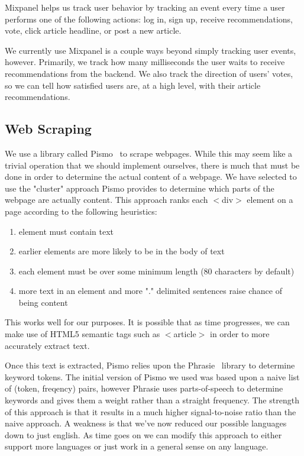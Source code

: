 \documentclass[11pt,letterpaper]{article}
\begin{document}
Mixpanel helps us track user behavior by tracking an event every time a user performs one of the following actions: log in, sign up, receive recommendations, vote, click article headline, or post a new article.

We currently use Mixpanel is a couple ways beyond simply tracking user events, however. Primarily, we track how many milliseconds the user waits to receive recommendations from the backend.
We also track the direction of users' votes, so we can tell how satisfied users are, at a high level, with their article recommendations.

\subsection{Web Scraping}
\label{sec:scraping}
We use a library called Pismo~\cite{pismo} to scrape
webpages.  While this may seem like a trivial operation that we should implement
ourselves, there is much that must be done in order to determine the actual
content of a webpage.  We have selected to use the "cluster" approach Pismo
provides to determine which parts of the webpage are actually content.  This
approach ranks each $<$div$>$ element on a page according to the following
heuristics:

\begin{enumerate}
 \item element must contain text
 \item earlier elements are more likely to be in the body of text
 \item each element must be over some minimum length (80 characters by default)
 \item more text in an element and more "." delimited sentences raise chance of
being content
\end{enumerate}

This works well for our purposes.  It is possible that as time progresses, we
can make use of HTML5 semantic tags such as $<$article$>$ in order to more
accurately extract text.

Once this text is extracted, Pismo relies upon the
Phrasie~\cite{phrasie} library to determine keyword tokens.
The initial version of Pismo we used was based upon a naive list of (token,
freqency) pairs, however Phrasie uses parts-of-speech to determine keywords and
gives them a weight rather than a straight frequency.  The strength of this
approach is that it results in a much higher signal-to-noise ratio than the
naive approach.  A weakness is that we've now reduced our possible languages
down to just english.  As time goes on we can modify this approach to either
support more languages or just work in a general sense on any language.
\end{document}

